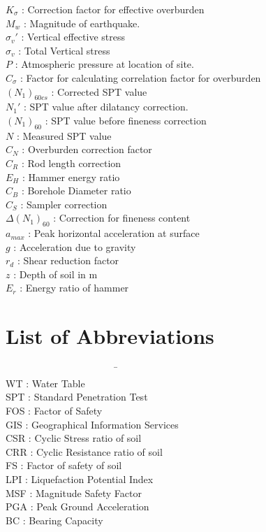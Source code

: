 \begin{tabbing}
$K_\sigma$ \> : \> Correction factor for effective overburden \\
$M_w$ \> : \> Magnitude of earthquake. \\
$\sigma_v'$ \> : \> Vertical effective stress \\
$\sigma_v$ \> : \> Total Vertical stress \\
$P$ \> : \> Atmospheric pressure at location of site. \\
$C_\sigma$ \> : \> Factor for calculating correlation factor for overburden \\
$(N_1)_{60cs}$ \> : \> Corrected SPT value \\
$N_1'$ \> : \> SPT value after dilatancy correction. \\
$({N_1})_{60}$ \> : \> SPT value before fineness correction \\
$N$ \> : \> Measured SPT value \\
$C_N$ \> : \> Overburden correction factor \\
$C_R$ \> : \> Rod length correction \\
$E_H$ \> : \> Hammer energy ratio \\
$C_B$ \> : \> Borehole Diameter ratio \\
$C_S$ \> : \> Sampler correction \\
$\Delta{(N_1)}_{60}$ \> : \> Correction for fineness content \\
$a_{max}$ \> : \> Peak horizontal acceleration at surface \\
$g$ \> : \> Acceleration due to gravity \\
$r_d$ \> : \> Shear reduction factor \\
$z$ \> : \> Depth of soil in m \\
$E_r$ \> : \> Energy ratio of hammer \\
\end{tabbing}

\chapter*{List of Abbreviations}
\begin{tabbing}
~~~~~~~~~~~~~~~~~~~~~~~\= ~~~~~~~~~~~~~~~~\= \\%
WT \> : \> Water Table\\
SPT \> : \> Standard Penetration Test\\
FOS \> : \> Factor of Safety \\
GIS \> : \> Geographical Information Services\\
CSR \> : \> Cyclic Stress ratio of soil\\
CRR \> : \> Cyclic Resistance ratio of soil\\
FS \> : \> Factor of safety of soil \\
LPI \> : \> Liquefaction Potential Index\\
MSF \> : \> Magnitude Safety Factor\\
PGA \> : \> Peak Ground Acceleration\\
BC \> : \> Bearing Capacity\\
\end{tabbing}
